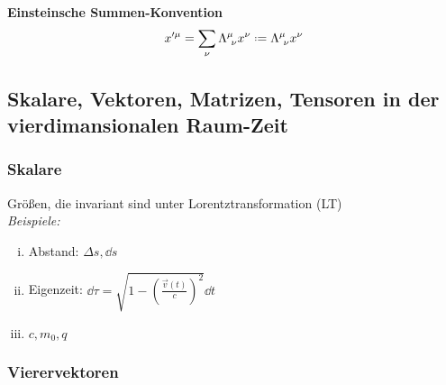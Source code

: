 \textbf{Einsteinsche Summen-Konvention}
\begin{equation*}
x'^{\mu} = \sum_{\nu} \Lambda^{\mu}_{\ \nu} x^{\nu} \defeq \Lambda^{\mu}_{\ \nu} x^{\nu}
\end{equation*}

\subsection{Skalare, Vektoren, Matrizen, Tensoren in der vierdimansionalen Raum-Zeit}

\subsubsection{Skalare}

Größen, die invariant sind unter Lorentztransformation (LT)\\[5pt]
\emph{Beispiele:}
\begin{enumerate}[i)]
	\item Abstand: $ \Delta s, \dd s $
	\item Eigenzeit: $ \dd \tau = \sqrt{1 - \left(\frac{\vec{v}(t)}{c}\right)^2} \dd t $ 
	\item $ c, m_0, q $
\end{enumerate}

\subsubsection{Vierervektoren}

